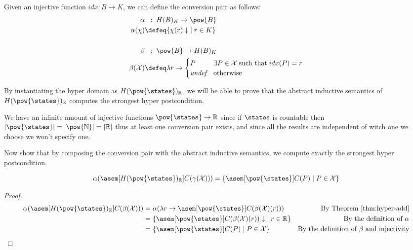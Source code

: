 \begin{definition}
  Given an injective function $idx : B \to K$, we can 
  define the conversion pair as follows:
  \begin{align*}
    \alpha &\;\;:\; H(B)_K \to \pow{B} \\
    \alpha(\chi) &\defeq \{ \chi(r) \downarrow \; \mid r \in K \} \\
    \\
    \beta &\;\;:\; \pow{B} \to H(B)_K \\
    \beta(\mathcal{X}) &\defeq \lambda r \to \begin{cases}
      P              & \exists P \in \mathcal{X} \; \text{such that} \; idx(P) = r \\
      \textit{undef} & \text{otherwise}
    \end{cases}
  \end{align*}
\end{definition}

By instantiating the hyper domain as $H(\pow{\states})_{\mathbb{R}}$, we will be 
able to prove that the abstract inductive semantics of 
$H(\pow{\states})_{\mathbb{R}}$ computes the strongest hyper postcondition.

We have an infinite amount of injective functions $\pow{\states} \to 
\mathbb{R}$ since if $\states$ is countable then $|\pow{\states}| = 
|\pow{\mathbb{N}}| = |\mathbb{R}|$ thus at least one conversion pair exists,
and since all the results are independent of witch one we choose we won't 
specify one.

Now show that by composing the conversion pair with the abstract 
inductive semantics, we compute exactly the strongest hyper postcondition.
\begin{theorem}
  \label{thm:hyperpost} 
  $$\alpha(\asem[H(\pow{\states})_\mathbb{R}]{C}(\gamma(\mathcal{X}))) = 
  \{ \asem[\pow{\states}]{C}(P) \mid P \in \mathcal{X} \}$$
\end{theorem}
\begin{proof}
  \begin{align*}
    \alpha(\asem[H(\pow{\states})_\mathbb{R}]{C}(\beta(\mathcal{X})))
      &= \alpha(\lambda r \to \asem[\pow{\states}]{C}(\beta(\mathcal{X})(r)))
      &\text{By Theorem \ref{thm:hyper-add}} \\
      &= \{ \asem[\pow{\states}]{C}(\beta(\mathcal{X})(r))\downarrow \;
        \mid r \in \mathbb{R} \}
      &\text{By the definition of $\alpha$}\\
      &= \{ \asem[\pow{\states}]{C}(P) \mid P \in \mathcal{X} \}
      &\text{By the definition of $\beta$ and injectivity}\\
  \end{align*}
\end{proof}

